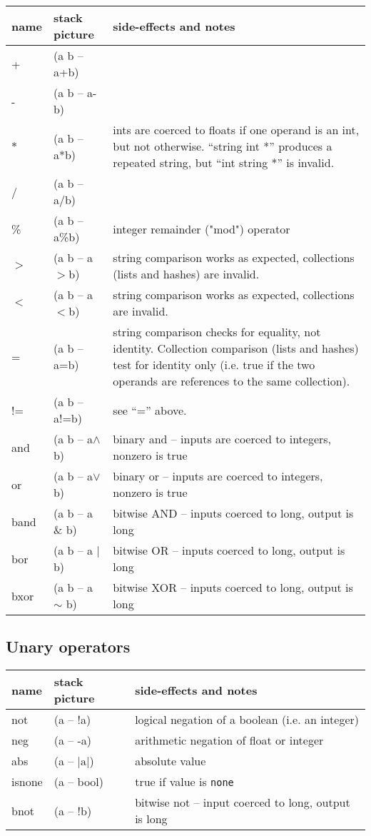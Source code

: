 \begin{center}
\begin{tabular}{|l|l|p{4in}|}\hline
\textbf{name} & \textbf{stack picture} & \textbf{side-effects and notes}\\ \hline
+    & (a b -- a+b)&\\
-    & (a b -- a-b)&\\
$*$    & (a b -- a*b)& ints are coerced to floats if one operand is an int, but not otherwise. ``string int *'' produces
a repeated string, but ``int string *'' is invalid.\\
/    & (a b -- a/b)&\\
\%    & (a b -- a\%b) & integer remainder ("mod") operator\\
$>$    & (a b -- a$>$b)& string comparison works as expected, collections (lists and hashes) are invalid.\\
$<$    & (a b -- a$<$b)& string comparison works as expected, collections are invalid.\\
=    & (a b -- a=b)& string comparison checks for equality, not identity. Collection comparison (lists and hashes) test for identity only (i.e. true if the two operands are references to the same collection).\\
!=   & (a b -- a!=b)& see ``='' above.\\
and & (a b -- a$\wedge$b) & binary and -- inputs are coerced to integers, nonzero is true\\
or & (a b -- a$\vee$b) & binary or  -- inputs are coerced to integers, nonzero is true\\
band & (a b -- a \& b) & bitwise AND -- inputs coerced to long, output is long \\
bor & (a b -- a $|$ b) & bitwise OR -- inputs coerced to long, output is long \\
bxor & (a b -- a $\sim$ b) & bitwise XOR -- inputs coerced to long, output is long \\
\hline
\end{tabular}
\end{center}

\subsection{Unary operators}
\begin{center}
\begin{tabular}{|l|l|p{4in}|}\hline
\textbf{name} & \textbf{stack picture} & \textbf{side-effects and notes}\\ \hline
not & (a -- !a) & logical negation of a boolean (i.e. an integer)\\
neg & (a -- -a) & arithmetic negation of float or integer\\
abs & (a -- $|\textrm{a}|$) & absolute value\\
isnone & (a -- bool) & true if value is \texttt{none} \\
bnot & (a -- !b) & bitwise not --  input coerced to long, output is long \\
\hline
\end{tabular}
\end{center}


